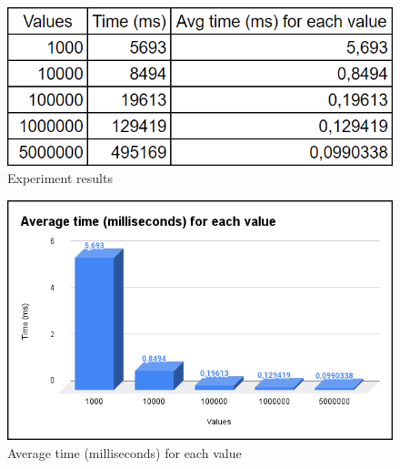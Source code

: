 \begin{figure}[!ht]
    \centering
    \includegraphics[scale=0.55]{document/chapters/chapter_7/images/experiment_results.png}
    \caption{Experiment results}
    \label{fig:experiment_results}
\end{figure}

\begin{figure}[!ht]
    \centering
    \includegraphics[scale=0.55]{document/chapters/chapter_7/images/experiment_results_avg_ms_per_value.png}
    \caption{Average time (milliseconds) for each value}
    \label{fig:experiment_results_avg_ms_per_value}
\end{figure}